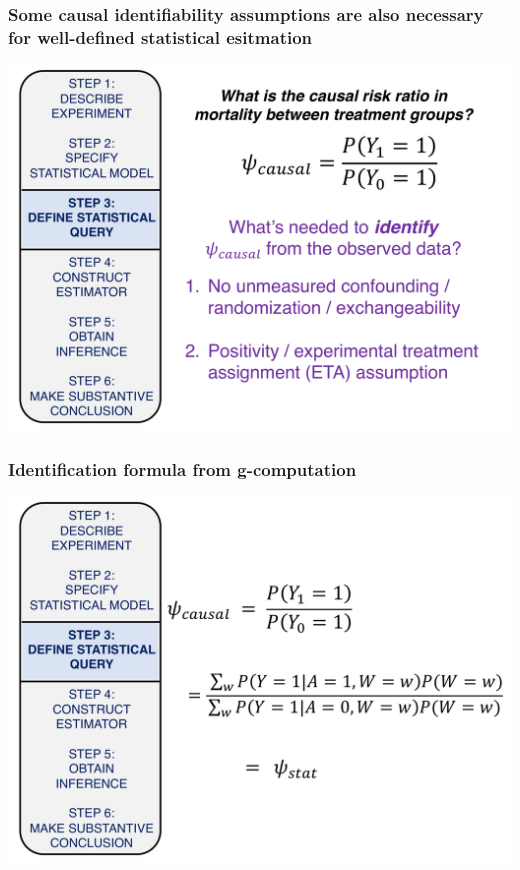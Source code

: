 \documentclass[t]{beamer}
\begin{document}
\begin{frame}
  \frametitle{Some causal identifiability assumptions are also necessary for well-defined statistical esitmation}
  \vspace{-20pt}
  \begin{center}
  \includegraphics[width = 1.05\textwidth]{figures/causalRR_identify2.pdf}
  \end{center}
\end{frame}

\begin{frame}
  \frametitle{Identification formula from g-computation}
  \vspace{-20pt}
  \begin{center}
  \includegraphics[width = 1.05\textwidth]{figures/Gcomp.pdf}
  \end{center}
\end{frame}
\end{document}
